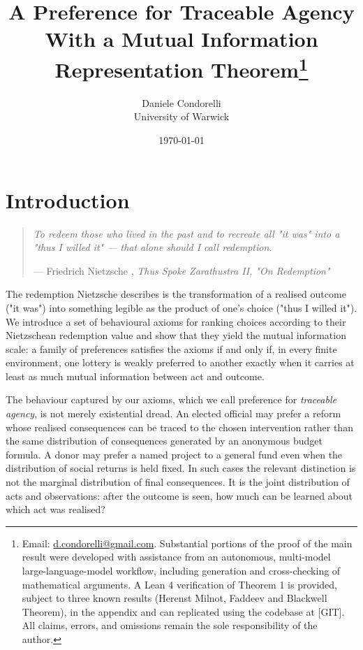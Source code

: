 \documentclass[11pt,a4paper]{article}
\title{A Preference for Traceable Agency\\[0.4em]\large With a Mutual Information Representation Theorem\thanks{Email: \href{mailto:d.condorelli@gmail.com}{d.condorelli@gmail.com}. Substantial portions of the proof of the main result were developed with assistance from an autonomous, multi-model large-language-model workflow, including generation and cross-checking of mathematical arguments. A Lean 4 verification of Theorem 1 is provided, subject to three known results (Herenst Milnot, Faddeev and Blackwell Theorem), in the appendix and can replicated using the codebase at [GIT]. All claims, errors, and omissions remain the sole responsibility of the author.}}
\author{Daniele Condorelli\\University of Warwick}
\date{\today}
\theoremstyle{definition}
\newcommand{\1}{\mathbf 1}
\begin{document}
\maketitle

\begin{abstract}
\end{abstract}

\section*{Introduction}

\begin{quote}
\emph{To redeem those who lived in the past and to recreate all "it was" into a "thus I willed it" — that alone should I call redemption.}

\hfill --- Friedrich Nietzsche , \emph{Thus Spoke Zarathustra II, "On Redemption"}
\end{quote}

 The redemption Nietzsche describes is the transformation of a realised outcome ("it was") into something legible as the product of one's choice ("thus I willed it").  We introduce a set of behavioural axioms for ranking choices according to their Nietzschean redemption value and show that they yield the mutual information scale: a family of preferences satisfies the axioms if and only if, in every finite environment, one lottery is weakly preferred to another exactly when it carries at least as much mutual information between act and
outcome. 


The behaviour captured by our axioms, which we call preference for \emph{traceable agency}, is not merely existential dread. An elected official may prefer a reform whose realised consequences can be traced to the chosen intervention rather than the same distribution of consequences generated by an anonymous budget formula.  A donor may prefer a named project to a general fund even when the distribution of social returns is held fixed.  In such cases the relevant distinction is not the marginal distribution of final consequences.  It is the joint distribution of acts and observations: after the
outcome is seen, how much can be learned about which act was realised?
\end{document}
